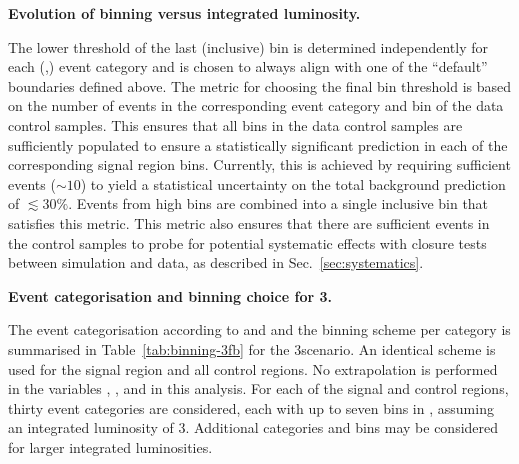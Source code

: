 {\bf Evolution of \HT binning versus integrated luminosity.} 

The lower threshold of the last (inclusive) \HT bin is determined
independently for each (\njet,\nb) event category and is chosen to
always align with one of the ``default'' boundaries defined above. The
metric for choosing the final bin threshold is based on the number of
events in the corresponding event category and \HT bin of the data
control samples. This ensures that all bins in the data control
samples are sufficiently populated to ensure a statistically
significant prediction in each of the corresponding signal region
bins. Currently, this is achieved by requiring sufficient events
($\sim 10$) to yield a statistical uncertainty on the total background
prediction of $\lesssim30\%$. Events from high \HT bins are combined
into a single inclusive bin that satisfies this metric. This metric
also ensures that there are sufficient events in the control samples
to probe for potential systematic effects with closure tests between
simulation and data, as described in Sec.~\ref{sec:systematics}.

{\bf Event categorisation and binning choice for 3\fbinv.} 

The event categorisation according to \njet and \nb and the \HT
binning scheme per category is summarised in
Table~\ref{tab:binning-3fb} for the 3\fbinv scenario. An identical
scheme is used for the signal region and all control regions. No
extrapolation is performed in the variables \njet, \nb, and \HT in
this analysis. For each of the signal and control regions, thirty
event categories are considered, each with up to seven bins in \HT,
assuming an integrated luminosity of 3\fbinv. Additional categories
and \HT bins may be considered for larger integrated luminosities.

